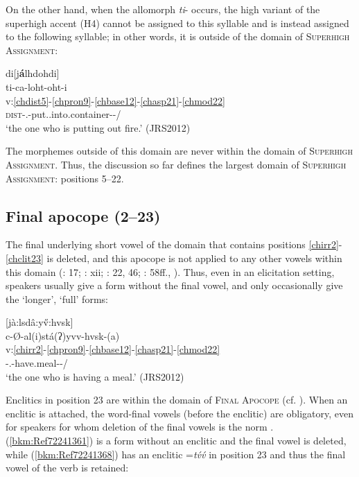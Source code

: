 \documentclass[output=paper]{langscibook}
\begin{document}
On the other hand, when the allomorph \textit{ti}{}- occurs, the high variant of the superhigh accent (H4) cannot be assigned to this syllable and is instead assigned to the following syllable; in other words, it is outside of the domain of \textsc{Superhigh} \textsc{Assignment}: 

\newpage
\ea\label{ex:outsidedomainsuperhigh} {di[j\textbf{á}lhdohdi]} \\
\glll ti-ca-loht-oht-i\\
v:\ref{chdist5}-\ref{chpron9}-\ref{chbase12}-\ref{chasp21}-\ref{chmod22}\\ 
\textsc{dist}-\Second\Sg.\Barg{}-put.\Cmpl{}.into.container-\Inf{}-\Nom/\Sh{}\\
\glt `the one who is putting out fire.' (JRS2012) 
\z 

The morphemes outside of this domain are never within the domain of \textsc{Superhigh} \textsc{Assignment}. Thus, the discussion so far defines the largest domain of \textsc{Superhigh} \textsc{Assignment}: positions {5--22}.


\subsection{Final apocope (2--23)}
\label{bkm:Ref87347578}
The final underlying short vowel of the domain that contains positions \ref{chirr2}-\ref{chclit23} is deleted, and this apocope is not applied to any other vowels within this domain (\citealt{Bender1946}: 17; \citealt{Feeling1975}: xii; \citealt{Scancarelli1987}: 22, 46; \citealt{Montgomery-Anderson2008}: 58ff., \citealt[Ch 2.3]{Uchihara2013}). Thus, even in an elicitation setting, speakers usually give a form without the final vowel, and only occasionally give the `longer', `full' forms:

\ea\label{ex:cher:key:32} {[jà:lsdâ:y\H{v}:hvsk]} \\
\glll c-Ø-al(i)stá(ʔ)yvv-hvsk-(a) \\
v:\ref{chirr2}-\ref{chpron9}-\ref{chbase12}-\ref{chasp21}-\ref{chmod22}\\ 
\Rel{}-\Third\Sg.\Aarg{}-have.meal-\Prs{}-\Ind/\Sh{}\\ 
\glt `the one who is having a meal.' (JRS2012)
\z 


Enclitics in position 23 are within the domain of \textsc{Final} \textsc{Apocope} (cf. \citealt{Haag1997, Haag1999}). When an enclitic is attached, the word-final vowels (before the enclitic) are obligatory, even for speakers for whom deletion of the final vowels is the norm \citep[139]{Lindsey1985}. (\ref{bkm:Ref72241361}) is a form without an enclitic and the final vowel is deleted, while (\ref{bkm:Ref72241368}) has an enclitic =\textit{t\'{v}\'{v}} in position 23 and thus the final vowel of the verb is retained: 
\end{document}
